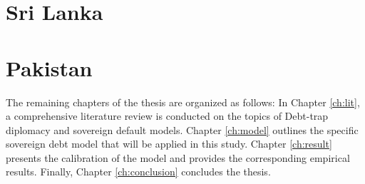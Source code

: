 \section*{Sri Lanka}

\section*{Pakistan}


The remaining chapters of the thesis are organized as follows:
In Chapter \ref{ch:lit}, a comprehensive literature review is conducted on the topics of Debt-trap diplomacy and sovereign default models.
Chapter \ref{ch:model} outlines the specific sovereign debt model that will be applied in this study.
Chapter \ref{ch:result} presents the calibration of the model and provides the corresponding empirical results.
Finally, Chapter \ref{ch:conclusion} concludes the thesis.